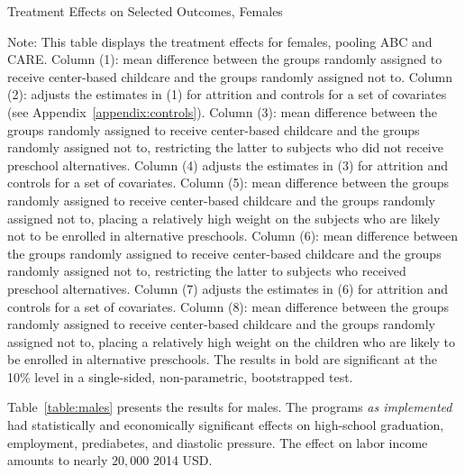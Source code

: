 \begin{table}[H] 
\begin{threeparttable}
\caption{Treatment Effects on Selected Outcomes, Females}
\label{table:females}
\centering
\scalebox{.97}{
}
\begin{tablenotes}
\footnotesize
\item Note: This table displays the treatment effects for females, pooling ABC and CARE. Column (1): mean difference between the groups randomly assigned to receive center-based childcare and the groups randomly assigned not to. Column (2): adjusts the estimates in (1) for attrition and controls for a set of covariates (see Appendix~\ref{appendix:controls}). Column (3): mean difference between the groups randomly assigned to receive center-based childcare and the groups randomly assigned not to, restricting the latter to subjects who did not receive preschool alternatives. Column (4) adjusts the estimates in (3) for attrition and controls for a set of covariates. Column (5): mean difference between the groups randomly assigned to receive center-based childcare and the groups randomly assigned not to, placing a relatively high weight on the subjects who are likely not to be enrolled in alternative preschools. Column (6): mean difference between the groups randomly assigned to receive center-based childcare and the groups randomly assigned not to, restricting the latter to subjects who received preschool alternatives. Column (7) adjusts the estimates in (6) for attrition and controls for a set of covariates. Column (8): mean difference between the groups randomly assigned to receive center-based childcare and the groups randomly assigned not to, placing a relatively high weight on the children who are likely to be enrolled in alternative preschools. The results in bold are significant at the 10\% level in a single-sided, non-parametric, bootstrapped test.
\end{tablenotes}
\end{threeparttable}
\end{table}

\noindent Table~\ref{table:males} presents the results for males. The programs \textit{as implemented} had statistically and economically significant effects on high-school graduation, employment, prediabetes, and diastolic pressure. The effect on labor income amounts to nearly $20,000$ 2014 USD.\\


